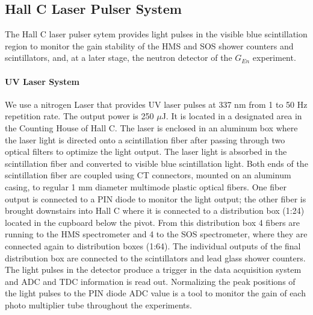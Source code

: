 \subsection{Hall C Laser Pulser System}
The Hall C laser pulser sytem provides light pulses
in the visible  blue scintillation region to monitor
the gain stability of the HMS and SOS shower counters and scintillators,
and, at a later stage, the neutron detector of the $G_{En}$ experiment.

\paragraph{UV Laser System}
We use a nitrogen Laser that provides UV laser pulses at 337 nm
from 1 to 50 Hz repetition rate. The output power is 250 $\mu$J.
It is located in a designated area in the Counting House of Hall C.
The laser is enclosed in an aluminum box where the laser light is directed
onto a scintillation fiber after passing through two optical filters
to optimize the light output. 
The laser light is absorbed in the scintillation fiber
and converted to visible blue scintillation light. Both ends of the
scintillation fiber are coupled using CT connectors, mounted on an
aluminum casing, to regular
1 mm diameter multimode plastic optical fibers. One fiber output is
connected to a PIN diode to monitor the light output; the other
fiber is brought downstairs into Hall C where it is connected to 
a distribution box (1:24) located in the cupboard below the pivot. From
this distribution box 4 fibers are running to the HMS spectrometer and
4 to the SOS spectrometer, where they
are connected again to distribution boxes (1:64). The individual
outputs of the final distribution box are connected to the scintillators
and lead glass shower counters. The light pulses in the detector
produce a trigger in the data acquisition system and ADC and TDC
information is read out. Normalizing the peak positions of the light 
pulses to the PIN diode ADC value is a tool to monitor the gain of
each photo multiplier tube throughout the experiments.

